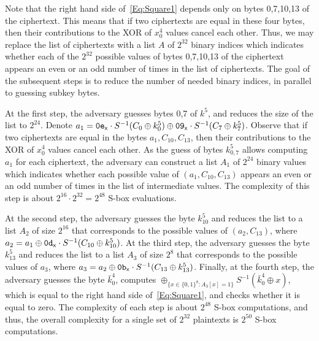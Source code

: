 Note that the right hand side of~\eqref{Eq:Square1} depends only on bytes 0,7,10,13 of the ciphertext. This means that if two ciphertexts are equal in these four bytes, then their contributions to the XOR of $x^4_0$ values cancel each other. Thus, we may replace the list of ciphertexts with a list $A$ of $2^{32}$ binary indices which indicates whether each of the $2^{32}$ possible values of bytes 0,7,10,13 of the ciphertext appears an even or an odd number of times in the list of ciphertexts. The goal of the subsequent steps is to reduce the number of needed binary indices, in parallel to guessing subkey bytes. 

At the first step, the adversary guesses bytes 0,7 of $k^5$, and reduces the size of the list to $2^{24}$. Denote $a_1 = \mathtt{0e}_{\mathsf{x}} \cdot S^{-1}(C_0 \oplus k^5_0) \oplus \mathtt{09}_{\mathsf{x}} \cdot S^{-1}(C_7 \oplus k^5_7)$. Observe that if two ciphertexts are equal in the bytes $a_1,C_{10},C_{13}$, then their contributions to the XOR of $x^4_0$ values cancel each other. As the guess of bytes $k^5_{0,7}$ allows computing $a_1$ for each ciphertext, the adversary can construct a list $A_1$ of $2^{24}$ binary values which indicates whether each possible value of $(a_1,C_{10},C_{13})$ appears an even or an odd number of times in the list of intermediate values. The complexity of this step is about $2^{16} \cdot 2^{32}=2^{48}$ S-box evaluations.

At the second step, the adversary guesses the byte $k^5_{10}$ and reduces the list to a list $A_2$ of size $2^{16}$ that corresponds to the possible values of $(a_2,C_{13})$, where $a_2 = a_1 \oplus \mathtt{0d}_{\mathsf{x}} \cdot S^{-1}(C_{10} \oplus k^5_{10})$. At the third step, the adversary guesses the byte $k^5_{13}$ and reduces the list to a list $A_3$ of size $2^{8}$ that corresponds to the possible values of $a_3$, where $a_3 = a_2 \oplus \mathtt{0b}_{\mathsf{x}} \cdot S^{-1}(C_{13} \oplus k^5_{13})$. Finally, at the fourth step, the adversary guesses the byte $\bar{k}^4_0$, computes $\oplus_{\{x \in \{0,1\}^8:A_3[x]=1\}} S^{-1}(\bar{k}^4_0 \oplus x)$, which is equal to the right hand side of~\eqref{Eq:Square1}, and checks whether it is equal to zero. The complexity of each step is about $2^{48}$ S-box computations, and thus, the overall complexity for a single set of $2^{32}$ plaintexts is $2^{50}$ S-box computations. 

